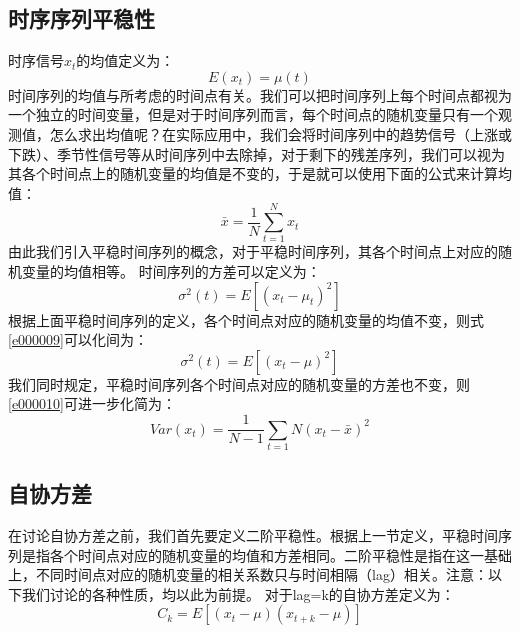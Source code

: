 \documentclass{article}
\begin{document}
\subsection{时序序列平稳性}
时序信号$x_{t}$的均值定义为：
\begin{equation}
E(x_{t})=\mu (t)
\label{e000007}
\end{equation}
时间序列的均值与所考虑的时间点有关。我们可以把时间序列上每个时间点都视为一个独立的时间变量，但是对于时间序列而言，每个时间点的随机变量只有一个观测值，怎么求出均值呢？在实际应用中，我们会将时间序列中的趋势信号（上涨或下跌）、季节性信号等从时间序列中去除掉，对于剩下的残差序列，我们可以视为其各个时间点上的随机变量的均值是不变的，于是就可以使用下面的公式来计算均值：
\begin{equation}
\bar{x}=\frac{1}{N} \sum_{t=1}^{N}x_{t}
\label{e000008}
\end{equation}
由此我们引入平稳时间序列的概念，对于平稳时间序列，其各个时间点上对应的随机变量的均值相等。
时间序列的方差可以定义为：
\begin{equation}
\sigma ^{2}(t)=E[(x_{t}-\mu _t)^{2}]
\label{e000009}
\end{equation}
根据上面平稳时间序列的定义，各个时间点对应的随机变量的均值不变，则式\ref{e000009}可以化间为：
\begin{equation}
\sigma ^{2}(t)=E[(x_{t}-\mu)^{2}]
\label{e000010}
\end{equation}
我们同时规定，平稳时间序列各个时间点对应的随机变量的方差也不变，则\ref{e000010}可进一步化简为：
\begin{equation}
Var(x_{t})=\frac{1}{N-1} \sum_{t=1}{N} (x_t - \bar{x})^{2}
\label{e000011}
\end{equation}
\subsection{自协方差}
在讨论自协方差之前，我们首先要定义二阶平稳性。根据上一节定义，平稳时间序列是指各个时间点对应的随机变量的均值和方差相同。二阶平稳性是指在这一基础上，不同时间点对应的随机变量的相关系数只与时间相隔（lag）相关。注意：以下我们讨论的各种性质，均以此为前提。
对于lag=k的自协方差定义为：
\begin{equation}
C_{k}=E[(x_{t} - \mu)(x_{t+k} - \mu)]
\label{e000012}
\end{equation}
\end{document}
